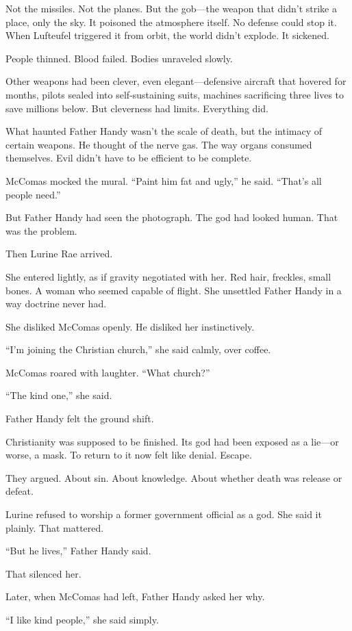 Not the missiles. Not the planes. But the gob—the weapon that didn’t strike a place, only the sky. It poisoned the atmosphere itself. No defense could stop it. When Lufteufel triggered it from orbit, the world didn’t explode. It sickened.

People thinned. Blood failed. Bodies unraveled slowly.

Other weapons had been clever, even elegant—defensive aircraft that hovered for months, pilots sealed into self-sustaining suits, machines sacrificing three lives to save millions below. But cleverness had limits. Everything did.

What haunted Father Handy wasn’t the scale of death, but the intimacy of certain weapons. He thought of the nerve gas. The way organs consumed themselves. Evil didn’t have to be efficient to be complete.

McComas mocked the mural. “Paint him fat and ugly,” he said. “That’s all people need.”

But Father Handy had seen the photograph. The god had looked human. That was the problem.

Then Lurine Rae arrived.

She entered lightly, as if gravity negotiated with her. Red hair, freckles, small bones. A woman who seemed capable of flight. She unsettled Father Handy in a way doctrine never had.

She disliked McComas openly. He disliked her instinctively.

“I’m joining the Christian church,” she said calmly, over coffee.

McComas roared with laughter. “What church?”

“The kind one,” she said.

Father Handy felt the ground shift.

Christianity was supposed to be finished. Its god had been exposed as a lie—or worse, a mask. To return to it now felt like denial. Escape.

They argued. About sin. About knowledge. About whether death was release or defeat.

Lurine refused to worship a former government official as a god. She said it plainly. That mattered.

“But he lives,” Father Handy said.

That silenced her.

Later, when McComas had left, Father Handy asked her why.

“I like kind people,” she said simply.


